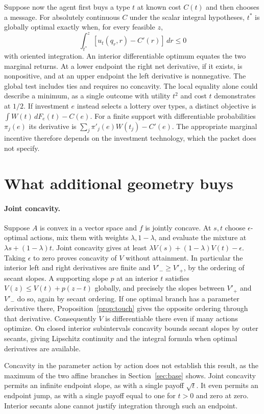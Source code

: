 \documentclass[11pt]{article}
\begin{document}
Suppose now the agent first buys a type $t$ at known cost $C(t)$ and then chooses a message. For absolutely continuous $C$ under the scalar integral hypotheses, $t^*$ is globally optimal exactly when, for every feasible $z$,
\[
 \int_{t^*}^z [u_t(q_r,r)-C'(r)]\,dr\le0
\]
with oriented integration. An interior differentiable optimum equates the two marginal returns. At a lower endpoint the right net derivative, if it exists, is nonpositive, and at an upper endpoint the left derivative is nonnegative. The global test includes ties and requires no concavity. The local equality alone could describe a minimum, as a single outcome with utility $t^2$ and cost $t$ demonstrates at $1/2$. If investment $e$ instead selects a lottery over types, a distinct objective is $\int W(t)\,dF_e(t)-C(e)$. For a finite support with differentiable probabilities $\pi_j(e)$ its derivative is $\sum_j\pi'_j(e)W(t_j)-C'(e)$. The appropriate marginal incentive therefore depends on the investment technology, which the packet does not specify.

\section{What additional geometry buys}\label{sec:reg}

\paragraph{Joint concavity.}
Suppose $A$ is convex in a vector space and $f$ is jointly concave. At $s,t$ choose $\epsilon$-optimal actions, mix them with weights $\lambda,1-\lambda$, and evaluate the mixture at $\lambda s+(1-\lambda)t$. Joint concavity gives at least $\lambda V(s)+(1-\lambda)V(t)-\epsilon$. Taking $\epsilon$ to zero proves concavity of $V$ without attainment. In particular the interior left and right derivatives are finite and $V'_-\ge V'_+$, by the ordering of secant slopes. A supporting slope $p$ at an interior $t$ satisfies $V(z)\le V(t)+p(z-t)$ globally, and precisely the slopes between $V'_+$ and $V'_-$ do so, again by secant ordering. If one optimal branch has a parameter derivative there, Proposition~\ref{prop:touch} gives the opposite ordering through that derivative. Consequently $V$ is differentiable there even if many actions optimize. On closed interior subintervals concavity bounds secant slopes by outer secants, giving Lipschitz continuity and the integral formula when optimal derivatives are available.

Concavity in the parameter action by action does not establish this result, as the maximum of the two affine branches in Section~\ref{sec:base} shows. Joint concavity permits an infinite endpoint slope, as with a single payoff $\sqrt t$. It even permits an endpoint jump, as with a single payoff equal to one for $t>0$ and zero at zero. Interior secants alone cannot justify integration through such an endpoint.
\end{document}
